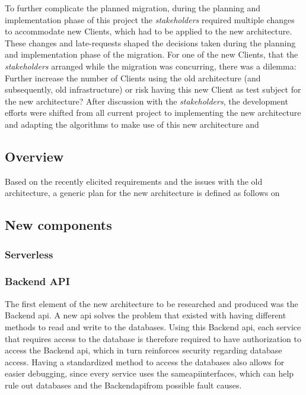 To further complicate the planned migration, during the planning and implementation phase of this project the \textit{stakeholders} required multiple changes to accommodate new Clients, which had to be applied to the new architecture. These changes and late-requests shaped the decisions taken during the planning and implementation phase of the migration. For one of the new Clients, that the \textit{stakeholders} arranged while the migration was concurring, there was a dilemma: Further increase the number of Clients using the old architecture (and subsequently, old infrastructure) or risk having this new Client as test subject for the new architecture? After discussion with the \textit{stakeholders}, the development efforts were shifted from all current project to implementing the new architecture and adapting the algorithms to make use of this new architecture and 


\subsection{Overview}\label{methodology:ss:overview-new-arch}
Based on the recently elicited requirements and the issues with the old architecture, a generic plan for the new architecture is defined as follows on 




\subsection{New components}\label{methodology:ss:new-components-new-arch}

\subsubsection{Serverless}\label{methodology:sss:serverless}


\subsubsection{Backend API}\label{methodology:sss:backendapi}
The first element of the new architecture to be researched and produced was the Backend \gls{api}. A new \gls{api} solves the problem that existed with having different methods to read and write to the databases. Using this Backend \gls{api}, each service that requires access to the database is therefore required to have authorization to access the Backend \gls{api}, which in turn reinforces security regarding database access. Having a standardized method to access the databases also allows for easier debugging, since every service uses the same\gls{api}interfaces, which can help rule out databases and the Backend\gls{api}from possible fault causes.

